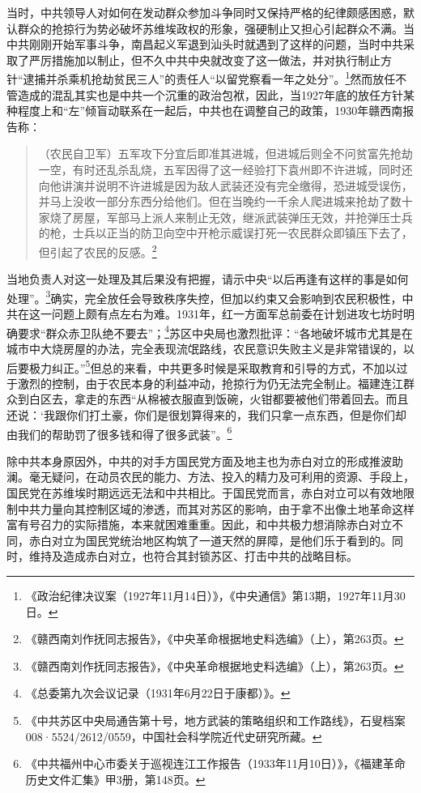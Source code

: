 当时，中共领导人对如何在发动群众参加斗争同时又保持严格的纪律颇感困惑，默认群众的抢掠行为势必破坏苏维埃政权的形象，强硬制止又担心引起群众不满。当中共刚刚开始军事斗争，南昌起义军退到汕头时就遇到了这样的问题，当时中共采取了严厉措施加以制止，但不久中共中央就改变了这一做法，并对执行制止方针“逮捕并杀乘机抢劫贫民三人”的责任人“以留党察看一年之处分”。\footnote{《政治纪律决议案（1927年11月14日）》，《中央通信》第13期，1927年11月30日。}然而放任不管造成的混乱其实也是中共一个沉重的政治包袱，因此，当1927年底的放任方针某种程度上和“左”倾盲动联系在一起后，中共也在调整自己的政策，1930年赣西南报告称：

\begin{quote}

（农民自卫军）五军攻下分宜后即准其进城，但进城后则全不问贫富先抢劫一空，有时还乱杀乱烧，五军因得了这一经验打下袁州即不许进城，同时还向他讲演并说明不许进城是因为敌人武装还没有完全缴得，恐进城受误伤，并马上没收一部分东西分给他们。但在当晚约一千余人爬进城来抢劫了数十家烧了房屋，军部马上派人来制止无效，继派武装弹压无效，并抢弹压士兵的枪，士兵以正当的防卫向空中开枪示威误打死一农民群众即镇压下去了，但引起了农民的反感。\footnote{《赣西南刘作抚同志报告》，《中央革命根据地史料选编》（上），第263页。}
\end{quote}


当地负责人对这一处理及其后果没有把握，请示中央“以后再逢有这样的事是如何处理”。\footnote{《赣西南刘作抚同志报告》，《中央革命根据地史料选编》（上），第263页。}确实，完全放任会导致秩序失控，但加以约束又会影响到农民积极性，中共在这一问题上颇有点左右为难。1931年，红一方面军总前委在计划进攻七坊时明确要求“群众赤卫队绝不要去”；\footnote{《总委第九次会议记录（1931年6月22日于康都）》。}苏区中央局也激烈批评：“各地破坏城市尤其是在城市中大烧房屋的办法，完全表现流氓路线，农民意识失败主义是非常错误的，以后要极力纠正。”\footnote{《中共苏区中央局通告第十号，地方武装的策略组织和工作路线》，石叟档案008·5524/2612/0559，中国社会科学院近代史研究所藏。}但总的来看，中共更多时候是采取教育和引导的方式，不加以过于激烈的控制，由于农民本身的利益冲动，抢掠行为仍无法完全制止。福建连江群众到白区去，拿走的东西“从棉被衣服直到饭碗，火钳都要被他们带着回去。而且还说：‘我跟你们打土豪，你们是很划算得来的，我们只拿一点东西，但是你们却由我们的帮助罚了很多钱和得了很多武装”。\footnote{《中共福州中心市委关于巡视连江工作报告（1933年11月10日）》，《福建革命历史文件汇集》甲3册，第148页。}


除中共本身原因外，中共的对手方国民党方面及地主也为赤白对立的形成推波助澜。毫无疑问，在动员农民的能力、方法、投入的精力及可利用的资源、手段上，国民党在苏维埃时期远远无法和中共相比。于国民党而言，赤白对立可以有效地限制中共力量向其控制区域的渗透，而其对苏区的影响，由于拿不出像土地革命这样富有号召力的实际措施，本来就困难重重。因此，和中共极力想消除赤白对立不同，赤白对立为国民党统治地区构筑了一道天然的屏障，是他们乐于看到的。同时，维持及造成赤白对立，也符合其封锁苏区、打击中共的战略目标。


